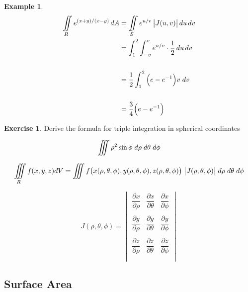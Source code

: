 \documentclass[11pt,a4paper]{article}
\theoremstyle{definition}
\newtheorem{exa}[thm]{Example}
\newtheorem{exe}[thm]{Exercise}
\begin{document}
\begin{exa}
\begin{align*}
\iint\limits_ R e^{(x+y)/(x-y)}\,dA & = \iint\limits_S e^{u/v}\,\big|J(u,v)\big| \,du \,dv\\
& = \int^2_1 \int^v_{-v} e^{u/v} \cdot \frac{1}{2}\,du\, dv\\\\
& = \frac{1}{2}\int^2_1 \Big( e - e^{-1}\Big) v \hspace{0.1cm}dv\\\\
& = \frac{3}{4}\Big( e - e^{-1}\Big)\\
\end{align*}
\end{exa}

\begin{exe}


Derive the formula for triple integration in spherical coordinates 

$$\iiint \rho^2 \sin \phi \hspace{0.1cm}d\rho \hspace{0.1cm} d\theta \hspace{0.1cm} d \phi$$

$$\iiint\limits_R f(x,y,z) dV = \iiint f\big( x(\rho, \theta, \phi), y(\rho, \theta, \phi), z(\rho, \theta, \phi)\big)\hspace{0.1cm}\big|J(\rho, \theta, \phi)\big|\hspace{0.1cm}d\rho\hspace{0.1cm} d\theta\hspace{0.1cm} d\phi$$

$$J(\rho, \theta, \phi)=\begin{vmatrix}
\dfrac{\partial x}{\partial \rho} & \dfrac{\partial x}{\partial \theta} & \dfrac{\partial x}{\partial \phi}\\\\
\dfrac{\partial y}{\partial \rho} & \dfrac{\partial y}{\partial \theta} & \dfrac{\partial y}{\partial \phi}\\\\
\dfrac{\partial z}{\partial \rho} & \dfrac{\partial z}{\partial \theta} & \dfrac{\partial z}{\partial \phi}\\\\
\end{vmatrix}
$$
\end{exe}


{\color[wave]{485}\subsection{Surface Area}}
\end{document}
